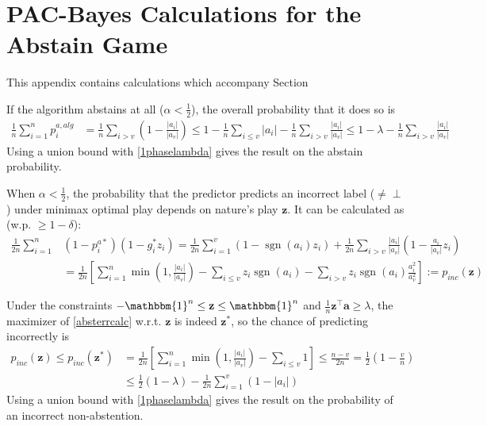 \documentclass{article}[12pt]
\theoremstyle{named}
\newcommand{\ones}[1]{\mathbbm{1}^{#1}}
\newcommand{\va}{\mathbf{a}}
\newcommand{\vz}{\mathbf{z}}
\DeclareMathOperator{\sgn}{sgn}
\newcommand{\abs}[1]{\left| #1 \right|}
\newcommand{\lrp}[1]{\left(#1\right)}
\begin{document}
\section{PAC-Bayes Calculations for the Abstain Game}
\label{sec:pbcalc}
This appendix contains calculations which accompany Section 

If the algorithm abstains at all ($\alpha < \frac{1}{2}$), 
the overall probability that it does so is
\begin{align*}
\frac{1}{n} \sum_{i=1}^n p_i^{a,alg} &= \frac{1}{n} \sum_{i > v} \lrp{1 - \frac{\abs{a_i}}{\abs{a_v}} }
\leq 1 - \frac{1}{n} \sum_{i \leq v} \abs{a_i} - \frac{1}{n} \sum_{i > v} \frac{\abs{a_i}}{\abs{a_v}} 
\leq 1 - \lambda - \frac{1}{n} \sum_{i > v} \frac{\abs{a_i}}{\abs{a_v}}
\end{align*}
Using a union bound with \eqref{1phaselambda} gives the result on the abstain probability.


When $\alpha < \frac{1}{2}$, the probability that the predictor predicts an incorrect label ($\neq \perp$) under minimax optimal play 
depends on nature's play $\vz$. 
It can be calculated as (w.p. $\geq 1 - \delta$):
\begin{align}
\label{absterrcalc}
\frac{1}{2n} \sum_{i=1}^n & \lrp{1 - p_i^{a*}} \lrp{ 1 - g_i^* z_i } = 
\frac{1}{2n} \sum_{i=1}^v \lrp{ 1 - \sgn(a_i) z_i } + \frac{1}{2n} \sum_{i>v} \frac{\abs{a_i}}{\abs{a_v}} \lrp{ 1 - \frac{a_i}{\abs{a_v}} z_i } \nonumber \\
&= \frac{1}{2n} \left[ \sum_{i=1}^n \min \lrp{1, \frac{\abs{a_i}}{\abs{a_v}} } - \sum_{i \leq v} z_i \sgn(a_i) - \sum_{i>v} z_i \sgn(a_i) \frac{a_i^2}{a_v^2} \right] 
:= p_{inc} (\vz)
\end{align}

Under the constraints $-\ones{n} \leq \vz \leq \ones{n}$ and $\frac{1}{n} \vz^\top \va \geq \lambda$, 
the maximizer of \eqref{absterrcalc} w.r.t. $\vz$ is indeed $\vz^*$, 
so the chance of predicting incorrectly is
\begin{align*}
p_{inc} (\vz) \leq p_{inc} (\vz^*) &= \frac{1}{2n} \left[ \sum_{i=1}^n \min \lrp{1, \frac{\abs{a_i}}{\abs{a_v}} } - \sum_{i \leq v} 1 \right] 
\leq \frac{n-v}{2n} = \frac{1}{2} \lrp{1 - \frac{v}{n} } \nonumber \\
&\leq \frac{1}{2} \lrp{1 - \lambda} - \frac{1}{2n} \sum_{i=1}^v \lrp{1 - \abs{a_i}}
\end{align*}
Using a union bound with \eqref{1phaselambda} gives the result on the probability of an incorrect non-abstention.
\end{document}

